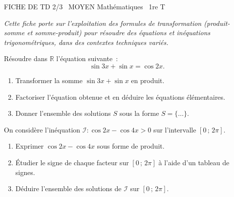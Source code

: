 \documentclass[11pt]{article}
\begin{document}
\begin{tcolorbox}[enhanced,colback=popink,colframe=popink,arc=10pt,boxrule=0pt,left=12pt,right=12pt,top=9pt,bottom=9pt]
{\color{white}\popxbold\small FICHE DE TD 2/3 \textbullet\ MOYEN \hfill Mathématiques \textbullet\ 1re T\par}
\end{tcolorbox}
\vspace{4pt}
\emph{Cette fiche porte sur l'exploitation des formules de transformation (produit-somme et somme-produit) pour résoudre des équations et inéquations trigonométriques, dans des contextes techniques variés.}

\begin{exercice}
Résoudre dans $\mathbb{R}$ l'équation suivante~:
\[
\sin 3x + \sin x = \cos 2x.
\]
\begin{enumerate}
    \item Transformer la somme $\sin 3x + \sin x$ en produit.
    \item Factoriser l'équation obtenue et en déduire les équations élémentaires.
    \item Donner l'ensemble des solutions $S$ sous la forme $S = \{ \dots \}$.
\end{enumerate}
\end{exercice}

\begin{exercice}
On considère l'inéquation $\mathcal{I} : \cos 2x - \cos 4x > 0$ sur l'intervalle $[0\,;\, 2\pi]$.
\begin{enumerate}
    \item Exprimer $\cos 2x - \cos 4x$ sous forme de produit.
    \item Étudier le signe de chaque facteur sur $[0\,;\, 2\pi]$ à l'aide d'un tableau de signes.
    \item Déduire l'ensemble des solutions de $\mathcal{I}$ sur $[0\,;\, 2\pi]$.
\end{enumerate}
\end{exercice}
\end{document}
